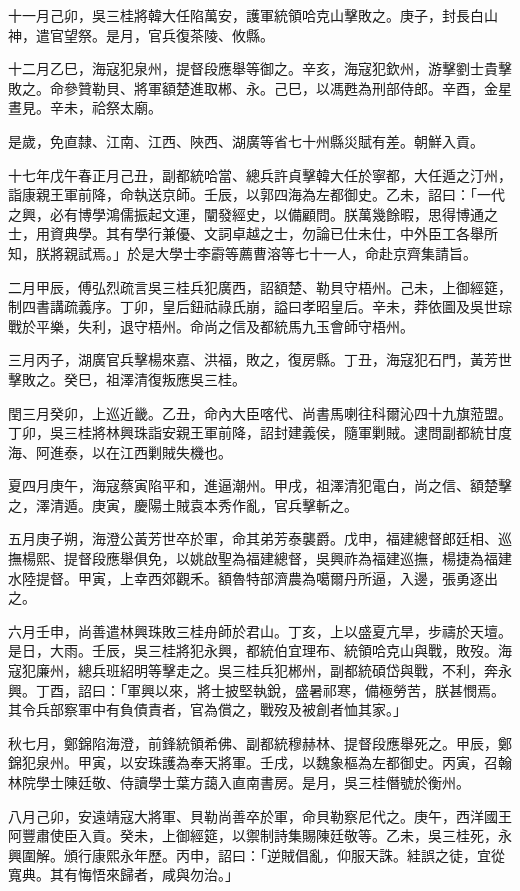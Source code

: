 \begin{pinyinscope}
十一月己卯，吳三桂將韓大任陷萬安，護軍統領哈克山擊敗之。庚子，封長白山神，遣官望祭。是月，官兵復茶陵、攸縣。

十二月乙巳，海寇犯泉州，提督段應舉等御之。辛亥，海寇犯欽州，游擊劉士貴擊敗之。命參贊勒貝、將軍額楚進取郴、永。己巳，以馮甦為刑部侍郎。辛酉，金星晝見。辛未，祫祭太廟。

是歲，免直隸、江南、江西、陜西、湖廣等省七十州縣災賦有差。朝鮮入貢。

十七年戊午春正月己丑，副都統哈當、總兵許貞擊韓大任於寧都，大任遁之汀州，詣康親王軍前降，命執送京師。壬辰，以郭四海為左都御史。乙未，詔曰：「一代之興，必有博學鴻儒振起文運，闡發經史，以備顧問。朕萬幾餘暇，思得博通之士，用資典學。其有學行兼優、文詞卓越之士，勿論已仕未仕，中外臣工各舉所知，朕將親試焉。」於是大學士李霨等薦曹溶等七十一人，命赴京齊集請旨。

二月甲辰，傅弘烈疏言吳三桂兵犯廣西，詔額楚、勒貝守梧州。己未，上御經筵，制四書講疏義序。丁卯，皇后鈕祜祿氏崩，謚曰孝昭皇后。辛未，莽依圖及吳世琮戰於平樂，失利，退守梧州。命尚之信及都統馬九玉會師守梧州。

三月丙子，湖廣官兵擊楊來嘉、洪福，敗之，復房縣。丁丑，海寇犯石門，黃芳世擊敗之。癸巳，祖澤清復叛應吳三桂。

閏三月癸卯，上巡近畿。乙丑，命內大臣喀代、尚書馬喇往科爾沁四十九旗蒞盟。丁卯，吳三桂將林興珠詣安親王軍前降，詔封建義侯，隨軍剿賊。逮問副都統甘度海、阿進泰，以在江西剿賊失機也。

夏四月庚午，海寇蔡寅陷平和，進逼潮州。甲戌，祖澤清犯電白，尚之信、額楚擊之，澤清遁。庚寅，慶陽土賊袁本秀作亂，官兵擊斬之。

五月庚子朔，海澄公黃芳世卒於軍，命其弟芳泰襲爵。戊申，福建總督郎廷相、巡撫楊熙、提督段應舉俱免，以姚啟聖為福建總督，吳興祚為福建巡撫，楊捷為福建水陸提督。甲寅，上幸西郊觀禾。額魯特部濟農為噶爾丹所逼，入邊，張勇逐出之。

六月壬申，尚善遣林興珠敗三桂舟師於君山。丁亥，上以盛夏亢旱，步禱於天壇。是日，大雨。壬辰，吳三桂將犯永興，都統伯宜理布、統領哈克山與戰，敗歿。海寇犯廉州，總兵班紹明等擊走之。吳三桂兵犯郴州，副都統碩岱與戰，不利，奔永興。丁酉，詔曰：「軍興以來，將士披堅執銳，盛暑祁寒，備極勞苦，朕甚憫焉。其令兵部察軍中有負債責者，官為償之，戰歿及被創者恤其家。」

秋七月，鄭錦陷海澄，前鋒統領希佛、副都統穆赫林、提督段應舉死之。甲辰，鄭錦犯泉州。甲寅，以安珠護為奉天將軍。壬戌，以魏象樞為左都御史。丙寅，召翰林院學士陳廷敬、侍讀學士葉方藹入直南書房。是月，吳三桂僭號於衡州。

八月己卯，安遠靖寇大將軍、貝勒尚善卒於軍，命貝勒察尼代之。庚午，西洋國王阿豐肅使臣入貢。癸未，上御經筵，以禦制詩集賜陳廷敬等。乙未，吳三桂死，永興圍解。頒行康熙永年歷。丙申，詔曰：「逆賊倡亂，仰服天誅。絓誤之徒，宜從寬典。其有悔悟來歸者，咸與勿治。」


\end{pinyinscope}
